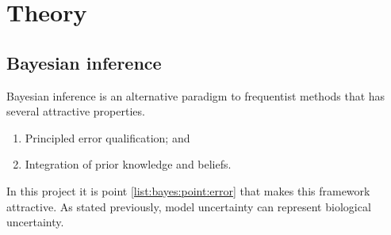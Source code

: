 \documentclass[12pt]{article} %
\begin{document}
	\section{Theory}	
	\subsection{Bayesian inference}	
	Bayesian inference is an alternative paradigm to frequentist methods that has several attractive properties.
	
	\begin{enumerate} \label{list:bayes}
		\item \label{list:bayes:point:error} Principled error qualification; and 
		\item Integration of prior knowledge and beliefs. %
	\end{enumerate}
	In this project it is point \ref{list:bayes:point:error} that makes this framework attractive. As stated previously, model uncertainty can represent biological uncertainty.
	
\end{document}
